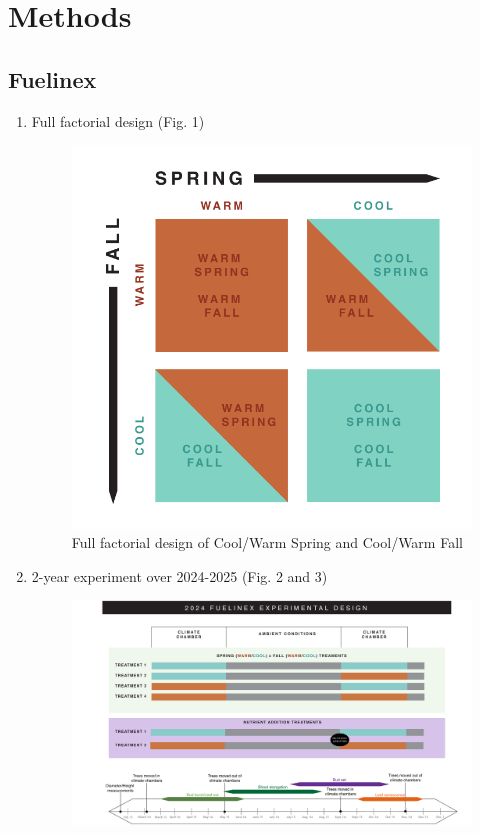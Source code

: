 \documentclass{article}
\begin{document}
\section{Methods}

\subsection{Fuelinex}
\begin {enumerate}
	\item Full factorial design (Fig. 1)
\begin{figure}[p] 
\includegraphics[width=1.1\textwidth]{FullFactorialFigure.pdf} 
\caption{Full factorial design of Cool/Warm Spring and Cool/Warm Fall}
\label{fig:sample}
\end{figure}
	\item 2-year experiment over 2024-2025 (Fig. 2 and 3)
\begin{figure}[p]
\includegraphics[width=1.1\textwidth]{Fuelinex_Design2024.pdf}

\end{figure}
\end{enumerate}
\end{document}
